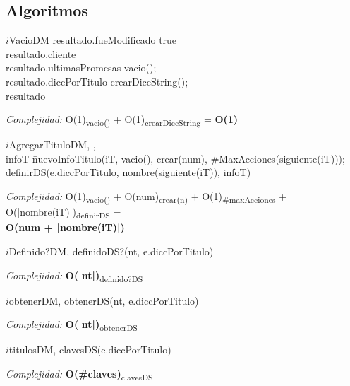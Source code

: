 \subsection{Algoritmos}

\begin{algorithm}{$i$VacioDM}{}{}
		resultado.fueModificado \leftarrow true \\
		resultado.cliente  \\
		resultado.ultimasPromesas \leftarrow vacio(); \\
		resultado.diccPorTitulo \leftarrow crearDiccString();\\
		\RETURN resultado
			\end{algorithm}
		\textit{Complejidad:}  
O(1)\textsubscript{vacio()} + O(1)\textsubscript{crearDiccString} = \textbf{O(1)} \\

 \begin{algorithm}{$i$AgregarTituloDM}{, ,  }{}
 			 \\
			infoT \= nuevoInfoTitulo(iT, vacio(), crear(num), $\#$MaxAcciones(siguiente(iT)));
 			definirDS(e.diccPorTitulo, nombre(siguiente(iT)), infoT) 
 			\end{algorithm}
 		\textit{Complejidad:}  
 		O(1)\textsubscript{vacio()} + O(num)\textsubscript{crear(n)} + O(1)\textsubscript{\#maxAcciones} + O(|nombre(iT)|)\textsubscript{definirDS} = \\
 		 \textbf{O(num + |nombre(iT)|)} \\
	
 \begin{algorithm}{$i$Definido?DM}{, }{}
 				\RETURN  definidoDS?(nt, e.diccPorTitulo)	
 			\end{algorithm}
		\textit{Complejidad:}  \textbf{O(|nt|)}\textsubscript{definido?DS}\\

	
 \begin{algorithm}{$i$obtenerDM}{, }{}
 				\RETURN  obtenerDS(nt, e.diccPorTitulo)
 	 			\end{algorithm}	
 	\textit{Complejidad:}  \textbf{O(|nt|)}\textsubscript{obtenerDS}\\

			
 \begin{algorithm}{$i$titulosDM}{, }{}
 				\RETURN  clavesDS(e.diccPorTitulo)	
\end{algorithm}
	\textit{Complejidad:}  \textbf{O(\#claves)}\textsubscript{clavesDS}\\

